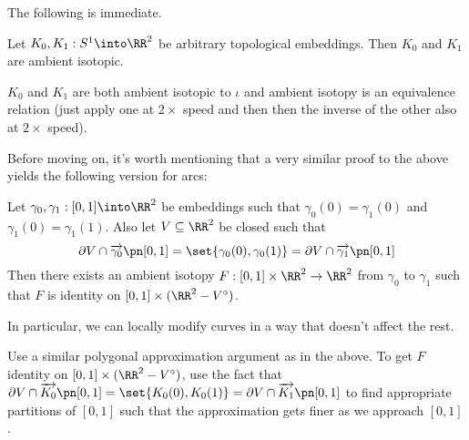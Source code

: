 \begin{sproof}
\end{sproof}
The following is immediate.
\begin{corollary}
  Let $K_0, K_1 : S^1 \into \RR^2$ be arbitrary topological
  embeddings. Then $K_0$ and $K_1$ are ambient isotopic.
\end{corollary}
\begin{sproof}
  $K_0$ and $K_1$ are both ambient isotopic to $\iota$ and ambient
  isotopy is an equivalence relation (just apply one at $2\times$
  speed and then then the inverse of the other also at $2\times$
  speed).
\end{sproof}
Before moving on, it's worth mentioning that a very similar proof to
the above yields the following version for arcs:
\begin{theorem}\label{thm:bounded-arcs-with-same-endpoints}
  Let $\gamma_0, \gamma_1 : [0,1] \into \RR^2$ be embeddings such that
  $\gamma_0(0) = \gamma_1(0)$ and $\gamma_1(0) = \gamma_1(1)$. Also
  let $V \subseteq \RR^2$ be closed such that
  \[
    \partial V \cap \fim{\gamma_0}{[0,1]} = \set{\gamma_0(0),
      \gamma_0(1)} = \partial V \cap \fim{\gamma_1}{[0,1]}
  \]
  Then there exists an ambient isotopy $F : [0,1] \times \RR^2 \to
  \RR^2$ from $\gamma_0$ to $\gamma_1$ such that $F$ is identity on
  $[0,1] \times (\RR^2 - V^\circ)$.
\end{theorem}
In particular, we can locally modify curves in a way that doesn't
affect the rest.
\begin{sproof}[Sketch]
  Use a similar polygonal approximation argument as in the above. To
  get $F$ identity on $[0,1] \times (\RR^2 - V^\circ)$, use the fact
  that $\partial V \cap \fim{K_0}{[0,1]} = \set{K_0(0), K_0(1)} =
  \partial V \cap \fim{K_1}{[0,1]}$ to find appropriate partitions of
  $[0,1]$ such that the approximation gets finer as we approach
  $[0,1]$.
\end{sproof}

